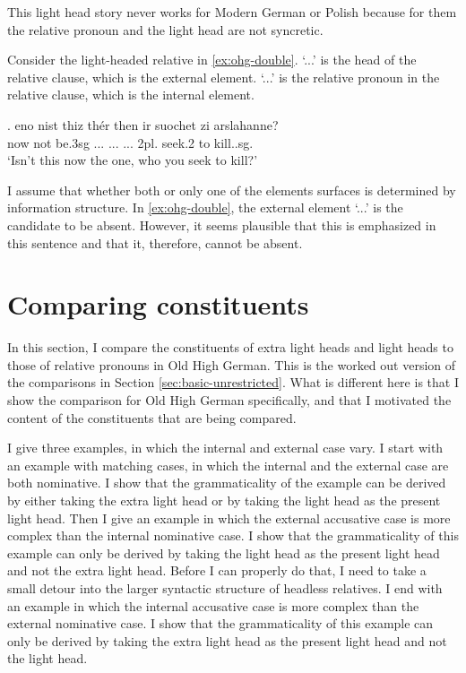 This light head story never works for Modern German or Polish because for them the relative pronoun and the light head are not syncretic.

Consider the light-headed relative in \ref{ex:ohg-double}.  `...' is the head of the relative clause, which is the external element.  `...' is the relative pronoun in the relative clause, which is the internal element.

\exg. eno nist thiz thér then ir suochet zi arslahanne?\\
 now {not be.3\ac{sg}} ... ...
 ... 2\ac{pl}. seek.2 to kill..\ac{sg}.\\
 `Isn't this now the one, who you seek to kill?'\label{ex:ohg-double}

I assume that whether both or only one of the elements surfaces is determined by information structure. In \ref{ex:ohg-double}, the external element  `...' is the candidate to be absent. However, it seems plausible that this is emphasized in this sentence and that it, therefore, cannot be absent.



\section{Comparing constituents}\label{sec:comparing-ohg}

In this section, I compare the constituents of extra light heads and light heads to those of relative pronouns in Old High German. This is the worked out version of the comparisons in Section \ref{sec:basic-unrestricted}. What is different here is that I show the comparison for Old High German specifically, and that I motivated the content of the constituents that are being compared.

I give three examples, in which the internal and external case vary.
I start with an example with matching cases, in which the internal and the external case are both nominative. I show that the grammaticality of the example can be derived by either taking the extra light head or by taking the light head as the present light head.
Then I give an example in which the external accusative case is more complex than the internal nominative case. I show that the grammaticality of this example can only be derived by taking the light head as the present light head and not the extra light head. Before I can properly do that, I need to take a small detour into the larger syntactic structure of headless relatives.
I end with an example in which the internal accusative case is more complex than the external nominative case. I show that the grammaticality of this example can only be derived by taking the extra light head as the present light head and not the light head.


